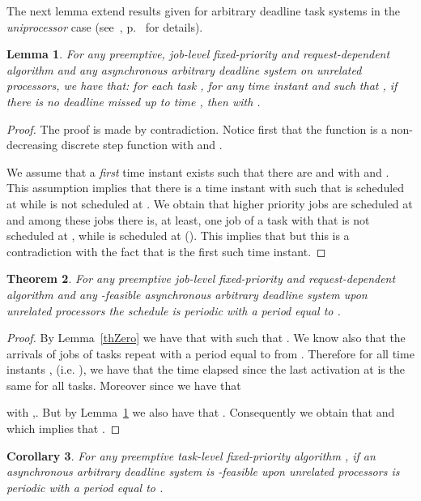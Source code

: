 \documentclass[a4paper,11pt]{article}
\newtheorem{Theorem}{Theorem}
\newtheorem{Lemma}[Theorem]{Lemma}
\newtheorem{Corollary}[Theorem]{Corollary}
\begin{document}
The next lemma extend results given for arbitrary
deadline task systems in the \emph{uniprocessor} case
(see~\cite{thesisJG}, p.~ for details).

\begin{Lemma} \label{prepTh} For any preemptive, job-level fixed-priority and request-dependent algorithm  and any asynchronous arbitrary deadline system  on  unrelated processors, we have that:
  for each task , for any time instant  and 
  such that , if there is no deadline
  missed up to time , then  with .
\end{Lemma}

\begin{proof}
  The proof is made by contradiction. Notice first that the function
   is a non-decreasing discrete step function with  and .

  We assume that a \emph{first} time instant  exists such that there are
   and  with  and
  . This assumption
  implies that there is a time instant  with 
  such that  is scheduled at  while
   is not scheduled at . We obtain that  higher priority jobs are scheduled at  and among these jobs there is, at least, one
  job  of a task  with
   that is not
  scheduled at , while 
  is scheduled at  (). This implies
  that 
  but this is a contradiction with the fact that  is the first such
  time instant.
\end{proof}

\begin{Theorem}\label{perGen} 
For any preemptive job-level fixed-priority and request-dependent algorithm  and any -feasible asynchronous arbitrary deadline system  
upon  unrelated processors the schedule is periodic with a period equal to . 
\end{Theorem}

\begin{proof}
  By Lemma~\ref{thZero} we have that  with  such that
  . We know also that the arrivals of jobs of
  tasks repeat with a period equal to  from . Therefore
  for all time instants ,  (i.e. ), we have that the time elapsed since the last activation at
   is the same for all tasks. Moreover
  since  we have that
  
  with ,. But by Lemma~\ref{prepTh} we also
  have that . Consequently we obtain that  and  which implies
  that . 
\end{proof}

\begin{Corollary}\label{task-levelperiod}
For any preemptive task-level fixed-priority algorithm , if an asynchronous arbitrary deadline system  is -feasible upon  unrelated processors is periodic with a period equal to .
\end{Corollary}
\end{document}
